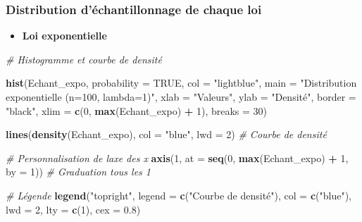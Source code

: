 \documentclass[
  12pt,
]{article}
\newenvironment{Shaded}{\begin{snugshade}}{\end{snugshade}}
\newcommand{\AttributeTok}[1]{\textcolor[rgb]{0.13,0.29,0.53}{#1}}
\newcommand{\CommentTok}[1]{\textcolor[rgb]{0.56,0.35,0.01}{\textit{#1}}}
\newcommand{\ConstantTok}[1]{\textcolor[rgb]{0.56,0.35,0.01}{#1}}
\newcommand{\DecValTok}[1]{\textcolor[rgb]{0.00,0.00,0.81}{#1}}
\newcommand{\FloatTok}[1]{\textcolor[rgb]{0.00,0.00,0.81}{#1}}
\newcommand{\FunctionTok}[1]{\textcolor[rgb]{0.13,0.29,0.53}{\textbf{#1}}}
\newcommand{\NormalTok}[1]{#1}
\newcommand{\SpecialCharTok}[1]{\textcolor[rgb]{0.81,0.36,0.00}{\textbf{#1}}}
\newcommand{\StringTok}[1]{\textcolor[rgb]{0.31,0.60,0.02}{#1}}
\providecommand{\tightlist}{%
  \setlength{\itemsep}{0pt}\setlength{\parskip}{0pt}}
\begin{document}
\subsubsection{Distribution d'échantillonnage de chaque
loi}\label{distribution-duxe9chantillonnage-de-chaque-loi}

\begin{itemize}
\tightlist
\item
  \textbf{Loi exponentielle}
\end{itemize}

\begin{Shaded}
\begin{Highlighting}[]
\CommentTok{\# Histogramme et courbe de densité}

\FunctionTok{hist}\NormalTok{(Echant\_expo, }\AttributeTok{probability =} \ConstantTok{TRUE}\NormalTok{, }\AttributeTok{col =} \StringTok{"lightblue"}\NormalTok{, }
     \AttributeTok{main =} \StringTok{"Distribution exponentielle (n=100, lambda=1)"}\NormalTok{,}
     \AttributeTok{xlab =} \StringTok{"Valeurs"}\NormalTok{, }\AttributeTok{ylab =} \StringTok{"Densité"}\NormalTok{, }\AttributeTok{border =} \StringTok{"black"}\NormalTok{,}
     \AttributeTok{xlim =} \FunctionTok{c}\NormalTok{(}\DecValTok{0}\NormalTok{, }\FunctionTok{max}\NormalTok{(Echant\_expo) }\SpecialCharTok{+} \DecValTok{1}\NormalTok{), }\AttributeTok{breaks =} \DecValTok{30}\NormalTok{)  }

\FunctionTok{lines}\NormalTok{(}\FunctionTok{density}\NormalTok{(Echant\_expo), }\AttributeTok{col =} \StringTok{"blue"}\NormalTok{, }\AttributeTok{lwd =} \DecValTok{2}\NormalTok{) }\CommentTok{\# Courbe de densité }

\CommentTok{\# Personnalisation de l\textquotesingle{}axe des x}
\FunctionTok{axis}\NormalTok{(}\DecValTok{1}\NormalTok{, }\AttributeTok{at =} \FunctionTok{seq}\NormalTok{(}\DecValTok{0}\NormalTok{, }\FunctionTok{max}\NormalTok{(Echant\_expo) }\SpecialCharTok{+} \DecValTok{1}\NormalTok{, }\AttributeTok{by =} \DecValTok{1}\NormalTok{))  }\CommentTok{\# Graduation tous les 1}

\CommentTok{\# Légende}
\FunctionTok{legend}\NormalTok{(}\StringTok{"topright"}\NormalTok{, }\AttributeTok{legend =} \FunctionTok{c}\NormalTok{(}\StringTok{"Courbe de densité"}\NormalTok{), }
       \AttributeTok{col =} \FunctionTok{c}\NormalTok{(}\StringTok{"blue"}\NormalTok{), }\AttributeTok{lwd =} \DecValTok{2}\NormalTok{, }\AttributeTok{lty =} \FunctionTok{c}\NormalTok{(}\DecValTok{1}\NormalTok{), }\AttributeTok{cex =} \FloatTok{0.8}\NormalTok{)}
\end{Highlighting}
\end{Shaded}
\end{document}
